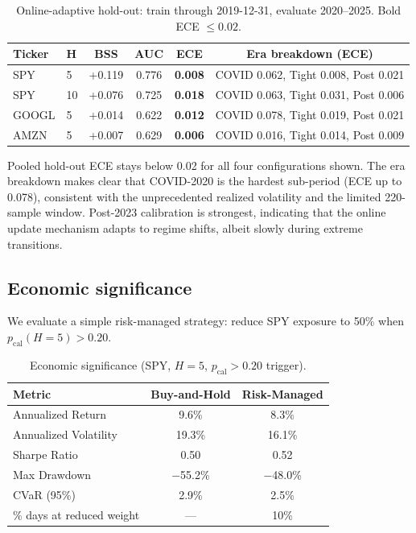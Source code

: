 \documentclass[11pt,a4paper]{article}
\newcommand{\pcal}{p_{\text{cal}}}
\begin{document}
\begin{table}[htbp]
\centering
\small
\caption{Online-adaptive hold-out: train through 2019-12-31, evaluate 2020--2025. Bold ECE $\leq 0.02$.}
\label{tab:holdout}
\begin{tabular}{llcccc}
\toprule
Ticker & H & BSS & AUC & ECE & Era breakdown (ECE) \\
\midrule
SPY   & 5  & +0.119 & 0.776 & \textbf{0.008} & COVID 0.062, Tight 0.008, Post 0.021 \\
SPY   & 10 & +0.076 & 0.725 & \textbf{0.018} & COVID 0.063, Tight 0.031, Post 0.006 \\
GOOGL & 5  & +0.014 & 0.622 & \textbf{0.012} & COVID 0.078, Tight 0.019, Post 0.021 \\
AMZN  & 5  & +0.007 & 0.629 & \textbf{0.006} & COVID 0.016, Tight 0.014, Post 0.009 \\
\bottomrule
\end{tabular}
\end{table}

Pooled hold-out ECE stays below 0.02 for all four configurations shown. The era breakdown makes clear that COVID-2020 is the hardest sub-period (ECE up to 0.078), consistent with the unprecedented realized volatility and the limited 220-sample window. Post-2023 calibration is strongest, indicating that the online update mechanism adapts to regime shifts, albeit slowly during extreme transitions.

\subsection{Economic significance}

We evaluate a simple risk-managed strategy: reduce SPY exposure to 50\% when $\pcal(H\!=\!5) > 0.20$.

\begin{table}[htbp]
\centering
\small
\caption{Economic significance (SPY, $H\!=\!5$, $\pcal > 0.20$ trigger).}
\label{tab:economic}
\begin{tabular}{lcc}
\toprule
Metric                 & Buy-and-Hold & Risk-Managed \\
\midrule
Annualized Return      & 9.6\%        & 8.3\% \\
Annualized Volatility  & 19.3\%       & 16.1\% \\
Sharpe Ratio           & 0.50         & 0.52 \\
Max Drawdown           & $-$55.2\%    & $-$48.0\% \\
CVaR (95\%)            & 2.9\%        & 2.5\% \\
\% days at reduced weight & ---        & 10\% \\
\bottomrule
\end{tabular}
\end{table}
\end{document}
